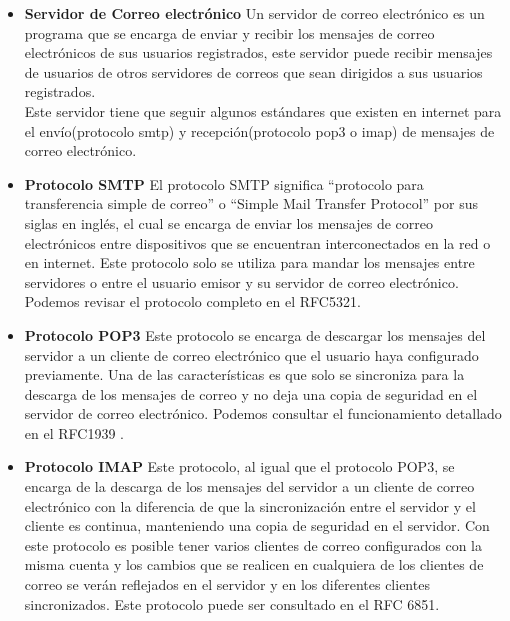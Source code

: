 \begin{itemize}
\item \textbf{Servidor de Correo electrónico}
Un servidor de correo electrónico es un programa que se encarga de enviar y recibir los mensajes de correo electrónicos de sus usuarios registrados, este servidor puede recibir 
mensajes  de  usuarios  de  otros  servidores  de  correos  que  sean  dirigidos  a  sus  usuarios registrados. \\
Este  servidor  tiene  que  seguir  algunos  estándares  que  existen  en  internet  para  el  envío(protocolo smtp)  y recepción(protocolo pop3 o imap) de mensajes de correo electrónico. 
\item \textbf{Protocolo SMTP}
El protocolo SMTP significa “protocolo para transferencia simple de correo” o “Simple Mail  Transfer  Protocol”   por  sus  siglas  en  inglés,  el  cual  se  encarga  de  enviar  los 
mensajes de correo electrónicos entre dispositivos que se encuentran interconectados en la  red  o  en  internet.  Este  protocolo  solo  se  utiliza  para mandar  los  mensajes  entre 
servidores  o  entre  el  usuario  emisor  y  su  servidor  de  correo  electrónico.  Podemos revisar el protocolo completo en el RFC5321\cite{RFC5321}.
\item \textbf{Protocolo POP3}
Este protocolo se encarga de descargar los mensajes del servidor a un cliente de correo electrónico  que  el  usuario  haya  configurado  previamente.  Una  de  las  características  es 
que  solo se sincroniza para  la descarga de  los  mensajes de  correo y  no deja una copia de seguridad en el servidor de correo electrónico. Podemos consultar el funcionamiento detallado en el RFC1939 \cite{1939}.
\item \textbf{Protocolo IMAP}
Este  protocolo,  al  igual  que  el  protocolo  POP3,  se  encarga  de  la descarga  de  los mensajes  del  servidor  a  un  cliente  de  correo  electrónico  con  la  diferencia  de  que  la 
sincronización  entre  el  servidor  y  el  cliente   es continua,  manteniendo  una  copia  de  seguridad  en  el  servidor.  Con  este  protocolo  es 
posible tener varios clientes de correo configurados con la misma  cuenta y los cambios que se realicen en cualquiera de los clientes de correo se verán reflejados en el servidor 
y  en  los  diferentes  clientes  sincronizados.  Este  protocolo  puede  ser  consultado  en  el RFC 6851\cite{6851}.\\ 


\end{itemize}

